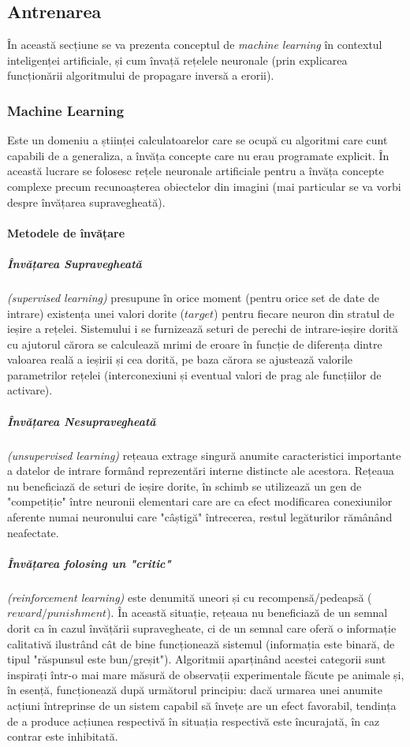 \subsection{Antrenarea}
În această secțiune se va prezenta conceptul de \textit{machine learning} în contextul inteligenței artificiale, și cum învață rețelele neuronale (prin explicarea funcționării algoritmului de propagare inversă a erorii).\newline

\subsubsection{Machine Learning}
Este un domeniu a științei calculatoarelor care se ocupă cu algoritmi care cunt capabili de a generaliza, a învăța concepte care nu erau programate explicit. În această lucrare se folosesc rețele neuronale artificiale pentru a învăța concepte complexe precum recunoașterea obiectelor din imagini (mai particular se va vorbi despre învățarea supravegheată).

\paragraph{Metodele de învățare}


\subparagraph{Învățarea Supravegheată} \textit{(supervised learning)} presupune în orice moment (pentru orice set de date de intrare) existența unei valori dorite ($target$) pentru fiecare neuron din stratul de ieșire a rețelei. Sistemului i se furnizează seturi de perechi de intrare-ieșire dorită cu ajutorul cărora se calculează mrimi de eroare în funcție de diferența dintre valoarea reală a ieșirii și cea dorită, pe baza cărora se ajustează valorile parametrilor rețelei (interconexiuni și eventual valori de prag ale funcțiilor de activare). 


\subparagraph{Învățarea Nesupravegheată} \textit{(unsupervised learning)} rețeaua extrage singură anumite caracteristici importante a datelor de intrare formând reprezentări interne distincte ale acestora. Rețeaua nu beneficiază de seturi de ieșire dorite, în schimb se utilizează un gen de "competiție" între neuronii elementari care are ca efect modificarea conexiunilor aferente numai neuronului care "câștigă" întrecerea, restul legăturilor rămânând neafectate.


\subparagraph{Învățarea folosing un "critic"} \textit{(reinforcement learning)} este denumită uneori și cu recompensă/pedeapsă ($reward/punishment$). În această situație, rețeaua nu beneficiază de un semnal dorit ca în cazul învățării supravegheate, ci de un semnal care oferă o informație calitativă ilustrând cât de bine funcționează sistemul (informația este binară, de tipul "răspunsul este bun/greșit"). Algoritmii aparținând acestei categorii sunt inspirați într-o mai mare măsură de observații experimentale făcute pe animale și, în esență, funcționează după următorul principiu: dacă urmarea unei anumite acțiuni întreprinse de un sistem capabil să învețe are un efect favorabil, tendința de a produce acțiunea respectivă în situația respectivă este încurajată, în caz contrar este inhibitată.



